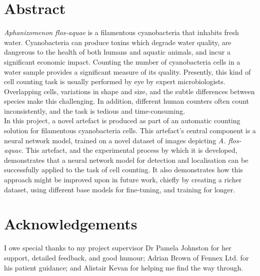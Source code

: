 \documentclass[11pt, twoside]{report}
\begin{document}


\chapter*{Abstract}
\textit{Aphanizomenon flos-aquae} is a filamentous cyanobacteria that inhabits fresh water. Cyanobacteria can produce toxins which degrade water quality, are dangerous to the health of both humans and aquatic animals, and incur a significant economic impact. Counting the number of cyanobacteria cells in a water sample provides a significant measure of its quality. Presently, this kind of cell counting task is usually performed by eye by expert microbiologists. Overlapping cells, variations in shape and size, and the subtle differences between species make this challenging. In addition, different human counters often count inconsistently, and the task is tedious and time-consuming.\\

In this project, a novel artefact is produced as part of an automatic counting solution for filamentous cyanobacteria cells. This artefact's central component is a neural network model, trained on a novel dataset of images depicting \textit{A. flos-aquae}. This artefact, and the experimental process by which it is developed, demonstrates that a neural network model for detection and localisation can be successfully applied to the task of cell counting. It also demonstrates how this approach might be improved upon in future work, chiefly by creating a richer dataset, using different base models for fine-tuning, and training for longer.

\chapter*{Acknowledgements}
I owe special thanks to my project supervisor Dr Pamela Johnston for her support, detailed feedback, and good humour; Adrian Brown of Fennex Ltd. for his patient guidance; and Alistair Kevan for helping me find the way through.

\tableofcontents

\listoffigures

\cleardoublepage
{}
















\nocite{*} %






\end{document}
